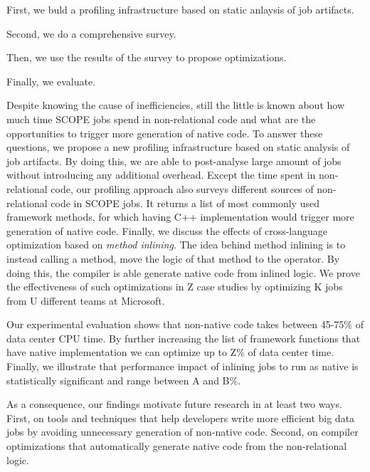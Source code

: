 



First, we buld a profiling infrastructure based on static anlaysis of job artifacts. 

Second, we do a comprehensive survey. 

Then, we use the results of the survey to propose optimizations. 

Finally, we evaluate. 

Despite knowing the cause of inefficiencies, still the little is known about how much time SCOPE jobs spend in non-relational code and what are the opportunities to trigger more generation of native code. 
To answer these questions, we propose a new profiling infrastructure based on static analysis of job artifacts.
By doing this, we are able to post-analyse large amount of jobs without introducing any additional overhead.
Except the time spent in non-relational code, our profiling approach also surveys different sources of non-relational code in SCOPE jobs.
It returns a list of most commonly used framework methods, for which having C++ implementation would trigger more generation of native code.
Finally, we discuss the effects of cross-language optimization based on \emph{method inlining}. 
The idea behind method inlining is to instead calling a method, move the logic of that method to the operator. By doing this, the compiler is able generate native code from inlined logic.
We prove the effectiveness of such optimizations in Z case studies by optimizing K jobs from U different teams at Microsoft. 

Our experimental evaluation shows that non-native code takes between 45-75\% of data center CPU time. By further increasing the list of framework functions that have native implementation we can optimize up to Z\% of data center time.
Finally, we illustrate that performance impact of inlining jobs to run as native is statistically significant and range between A and B\%. 

As a consequence, our findings motivate future research in at least two ways.
First, on tools and techniques that help developers write more efficient big data jobs by avoiding unnecessary generation of non-native code. 
Second, on compiler optimizations that automatically generate native code from the non-relational logic.


